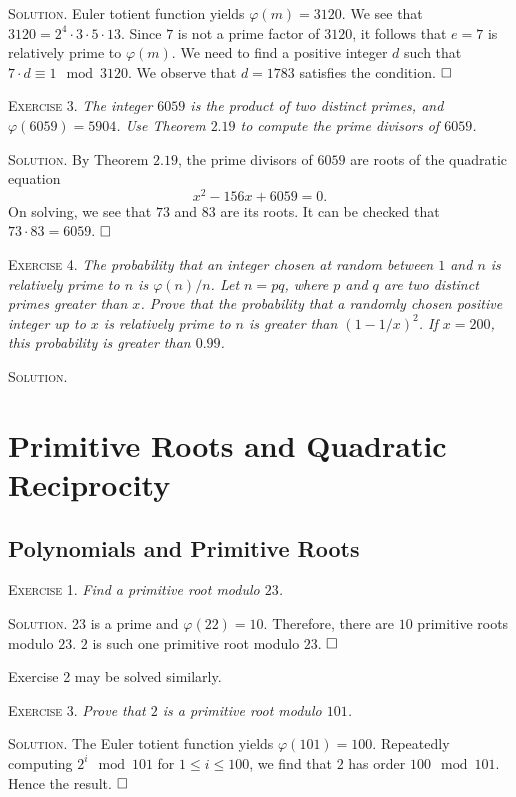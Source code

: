\documentclass[11pt, leqno]{article}
\newcommand{\done}{\ensuremath{\hfill\square}}
\begin{document}
\textsc{Solution}. Euler totient function yields $\varphi(m) = 3120$. We see that $3120 = 2^4 \cdot 3 \cdot 5 \cdot 13$. Since $7$ is not a prime factor of $3120$, it follows that $e = 7$ is relatively prime to $\varphi(m)$. We need to find a positive integer $d$ such that $7\cdot d \equiv 1 \mod 3120$.
We observe that $d = 1783$ satisfies the condition. \done

\textsc{Exercise 3}. \emph{The integer $6059$ is the product of two distinct primes, and $\varphi(6059) = 5904$. Use Theorem $2.19$ to compute the prime divisors of $6059$.}

\textsc{Solution}. By Theorem $2.19$, the prime divisors of $6059$ are roots of the quadratic equation 
\begin{displaymath}
x^2 - 156x + 6059 = 0.
\end{displaymath}
On solving, we see that $73$ and $83$ are its roots. It can be checked that $73\cdot 83 = 6059$. \done

\textsc{Exercise 4}. \emph{The probability that an integer chosen at random between $1$ and $n$ is relatively prime to $n$ is $\varphi(n)/n$. Let $n=pq$, where $p$ and $q$ are two distinct primes greater than $x$. Prove that the probability that a randomly chosen positive integer up to $x$ is relatively prime to $n$ is greater than $(1-1/x)^{2}$. If $x=200$, this probability is greater than $0.99$.}

\textsc{Solution}. 

\clearpage
\section{Primitive Roots and Quadratic Reciprocity}

\subsection{Polynomials and Primitive Roots}

\textsc{Exercise 1}. \emph{Find a primitive root modulo $23$.}

\textsc{Solution}. 23 is a prime and $\varphi(22) = 10$. Therefore, there are $10$ primitive roots modulo $23$. $2$ is such one primitive root modulo $23$. \done

Exercise 2 may be solved similarly.

\textsc{Exercise 3}. \emph{Prove that $2$ is a primitive root modulo $101$.}

\textsc{Solution}. The Euler totient function yields $\varphi(101) = 100$. Repeatedly computing $2^i \mod 101$ for $1\leq i \leq 100$, we find that $2$ has order $100 \mod 101$. Hence the result. \done
\end{document}
